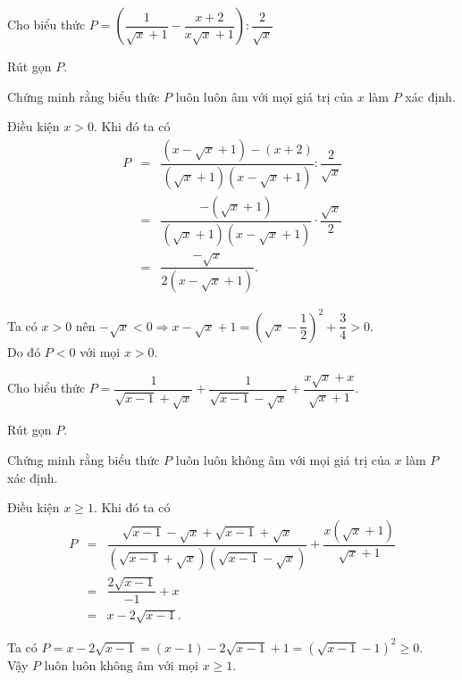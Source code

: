 \begin{bt}%
	Cho biểu thức $P=\left(\dfrac{1}{\sqrt{x} + 1} - \dfrac{x + 2}{x\sqrt{x} + 1}\right) :\dfrac{2}{\sqrt{x}}$
	\begin{listEX}
	\item Rút gọn $P.$
	\item Chứng minh rằng biểu thức $P$ luôn luôn âm với mọi giá trị của $x$ làm $P$ xác định.
	\end{listEX}
	\loigiai
	{
\begin{listEX}
	\item Điều kiện $x>0$. Khi đó ta có
	\allowdisplaybreaks 
	\begin{eqnarray*}
	P&=&\dfrac{(x-\sqrt{x}+1)-(x+2)}{(\sqrt{x}+1)(x-\sqrt{x}+1)} \colon \dfrac{2}{\sqrt{x}}\\
	&=&\dfrac{-(\sqrt{x}+1)}{(\sqrt{x}+1)(x-\sqrt{x}+1)} \cdot \dfrac{\sqrt{x}}{2}\\
	&=&\dfrac{-\sqrt{x}}{2(x-\sqrt{x}+1)}.
	\end{eqnarray*}
	\item Ta có $x>0$ nên $-\sqrt{x}<0 \Rightarrow x - \sqrt{x} + 1=\left(\sqrt{x} - \dfrac{1}{2}\right)^2 + \dfrac{3}{4}>0$.\\ Do đó $P<0$ với mọi $x>0$.
	\end{listEX}
}
\end{bt}
\begin{bt}%
	Cho biểu thức $P=\dfrac{1}{\sqrt{x - 1} + \sqrt{x}} + \dfrac{1}{\sqrt{x - 1} - \sqrt{x}} + \dfrac{x\sqrt{x} + x}{\sqrt{x} + 1}$.
	\begin{listEX}
	\item Rút gọn $P$.
	\item Chứng minh rằng biểu thức $P$ luôn luôn không âm với mọi giá trị của $x$ làm $P$ xác định. 
	\end{listEX}
	\loigiai
	{
\begin{listEX}
	\item Điều kiện $x\ge 1$. Khi đó ta có 
	\begin{eqnarray*}
	P&=&\dfrac{\sqrt{x-1}-\sqrt{x}+\sqrt{x-1}+\sqrt{x}}{(\sqrt{x-1}+\sqrt{x})(\sqrt{x-1}-\sqrt{x})}+\dfrac{x(\sqrt{x}+1)}{\sqrt{x}+1}\\
	&=&\dfrac{2 \sqrt{x-1}}{-1}+x\\
	&=&x-2 \sqrt{x-1}.
	\end{eqnarray*}
	\item Ta có $P=x-2 \sqrt{x-1}=(x-1)-2 \sqrt{x-1}+1=\left(\sqrt{x-1}-1\right)^2 \geq 0$.\\
	Vậy $P$ luôn luôn không âm với mọi $x \ge 1$.
\end{listEX}
	}
\end{bt}
